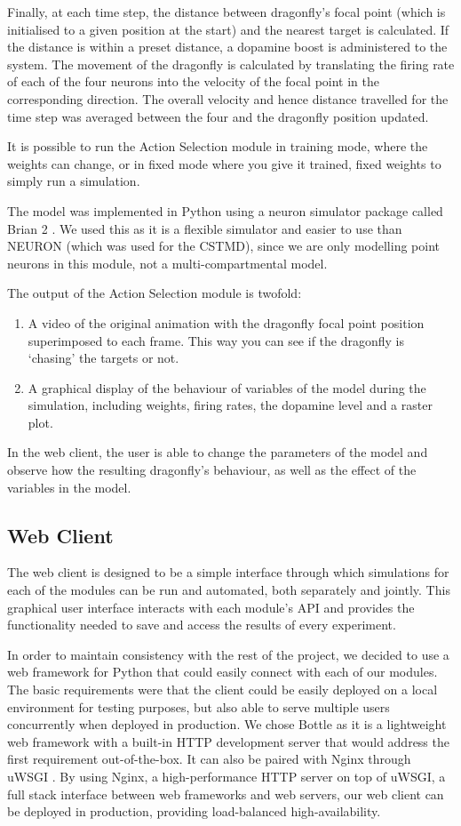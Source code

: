 \documentclass[a4paper,11pt]{article}
\begin{document}
Finally, at each time step, the distance between dragonfly's focal point (which is initialised to a given position at the start) and the nearest target is calculated. If the distance is within a preset distance, a dopamine boost is administered to the system. The movement of the dragonfly is calculated by translating the firing rate of each of the four neurons into the velocity of the focal point in the corresponding direction. The overall velocity and hence distance travelled for the time step was averaged between the four and the dragonfly position updated. 

It is possible to run the Action Selection module in training mode, where the weights can change, or in fixed mode where you give it trained, fixed weights to simply run a simulation. 

The model was implemented in Python using a neuron simulator package called Brian 2 \cite{brian}. We used this as it is a flexible simulator and easier to use than NEURON (which was used for the CSTMD), since we are only modelling point neurons in this module, not a multi-compartmental model. 

The output of the Action Selection module is twofold:
\begin{enumerate}
\item A video of the original animation with the dragonfly focal point position superimposed to each frame. This way you can see if the dragonfly is `chasing' the targets or not.
\item A graphical display of the behaviour of variables of the model during the simulation, including weights, firing rates, the dopamine level and a raster plot.
\end{enumerate}
In the web client, the user is able to change the parameters of the model and observe how the resulting dragonfly's behaviour, as well as the effect of the variables in the model.

\subsection{Web Client}
The web client is designed to be a simple interface through which simulations for each of the modules can be run and automated, both separately and jointly. This graphical user interface interacts with each module's API and provides the functionality needed to save and access the results of every experiment.

In order to maintain consistency with the rest of the project, we decided to use a web framework for Python that could easily connect with each of our modules. The basic requirements were that the client could be easily deployed on a local environment for testing purposes, but also able to serve multiple users concurrently when deployed in production. We chose Bottle \cite{bottle} as it is a lightweight web framework with a built-in HTTP development server that would address the first requirement out-of-the-box. It can also be paired with Nginx \cite{nginx} through uWSGI \cite{uwsgi}. By using Nginx, a high-performance HTTP server on top of uWSGI, a full stack interface between web frameworks and web servers, our web client can be deployed in production, providing load-balanced high-availability.
\end{document}
